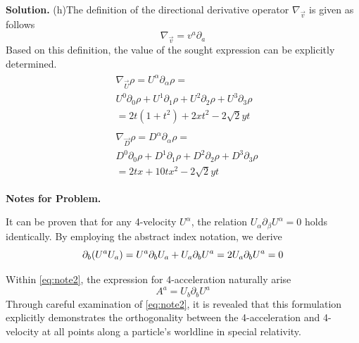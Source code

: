 \documentclass[12pt, a4paper, oneside]{article}
\newcounter{problemname}
\newenvironment{solution}{\par\noindent\textbf{Solution. }}{\par}
\newenvironment{note}{\par\noindent\textbf{Notes for Problem\arabic{problemname}. }}{\par}
\newcommand{\vc}[1]{\ensuremath{\overrightarrow{#1}}}
\newcommand{\p}{\partial}
\begin{document}
\begin{solution}
    (h)The definition of the directional derivative operator $\nabla_{\vc{v}}$ is given as follows
    \[\nabla_{\vc{v}}=v^a\p_a\]
    Based on this definition, the value of the sought expression can be explicitly determined.
    \begin{align}
        \begin{split}
            &\nabla_{\vc{U}}\rho=U^\alpha\p_\alpha\rho=\\
            &U^0\p_0\rho + U^1\p_1\rho + U^2\p_2\rho + U^3\p_3\rho\\
            &= 2t(1+t^2)+2xt^2-2\sqrt{2}yt
        \end{split}\\
        \begin{split}
            &\nabla_{\vc{D}}\rho=D^\alpha\p_\alpha\rho=\\
            &D^0\p_0\rho + D^1\p_1\rho + D^2\p_2\rho + D^3\p_3\rho\\
            &= 2tx+10tx^2-2\sqrt{2}yt
        \end{split}
    \end{align}
\end{solution}

\begin{note}

    It can be proven that for any 4-velocity $U^\alpha$, the relation $U_\alpha\p_\beta U^\alpha=0$ holds identically. By employing the abstract index notation, we derive
    \begin{equation}
        \p_b\qty(U^aU_a)=U^a\p_bU_a+U_a\p_bU^a=2U_a\p_bU^a=0\label{eq:note2}
    \end{equation}

    Within \cref{eq:note2}, the expression for 4-acceleration naturally arise
    \begin{equation*}
        A^a = U_b\p_b U^a
    \end{equation*}
    Through careful examination of \cref{eq:note2}, it is revealed that this formulation explicitly demonstrates the orthogonality between the 4-acceleration and 4-velocity at all points along a particle's worldline in special relativity.
\end{note}
\end{document}
